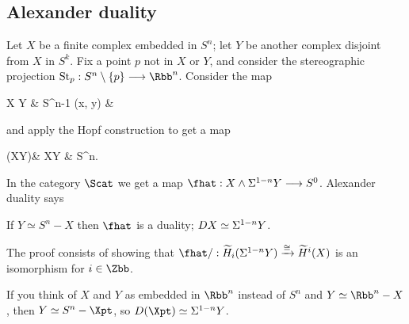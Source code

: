 \subsection*{Alexander duality}
Let $X$ be a finite complex embedded in $S^n$; let $Y$ be another complex disjoint from $X$ in $S^k$. Fix a point $p$ not in $X$ or $Y$, and consider the stereographic projection $\textup{St}_p:S^n\setminus\{p\}\to\Rbb^n$.  Consider the map
\begin{cjointikzcd}
\diagram  X \times Y  \rar & S^{n-1}
%
\diagram {}
%
\diagram (x, y)  \rar[mapsto] & 
\end{cjointikzcd}
and apply the Hopf construction to get a map
\begin{ctikzcd}
\Sigma(X\wedge Y)\rar["\simeq"] & X\ast Y \rar & S^n.
\end{ctikzcd}
In the category $\Scat$ we get a map $\fhat: X \sprod \Suspend^{1-n} Y \to S^0$.  Alexander duality says
\begin{thm}
If $Y \simeq S^n - X$ then $\fhat$ is a duality; $DX \simeq \Sigma^{1-n} Y$.
\end{thm}
\noindent The proof consists of showing that $\fhat/: \widetilde H_i (\Suspend^{1-n} Y) \xrightarrow{\cong} \widetilde H^i (X)$ is an isomorphism for $i \in \Zbb$.
\begin{rem}
If you think of $X$ and $Y$ as embedded in $\Rbb^n$ instead of $S^n$ and $Y \simeq \Rbb^n - X$, then $Y \simeq S^n - \Xpt$, so $D(\Xpt) \simeq \Suspend^{1-n} Y$.
\end{rem}

